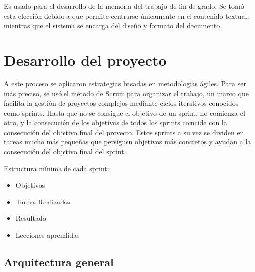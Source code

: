 \documentclass[a4paper, 12pt]{book}
\let\cleardoublepage\clearpage
\begin{document}
Es usado para el desarrollo de la memoria del trabajo de fin de grado. Se tomó esta elección debido a que permite centrarse únicamente en el contenido textual, mientras que el sistema se encarga del diseño y formato del documento. 
\label{sec:seccion11}

\chapter{Desarrollo del proyecto}
\label{chap:Desarollo}
A este proceso se aplicaron estrategias basadas en metodologías ágiles. Para ser más preciso, se usó el método de Scrum para organizar el trabajo, un marco que facilita la gestión de proyectos complejos mediante ciclos iterativos conocidos como sprints. Hasta que no se consigue el objetivo de un sprint, no comienza el otro, y la consecución de los objetivos de todos los sprints coincide con la consecución del objetivo final del proyecto. Estos sprints a su vez se dividen en tareas mucho más pequeñas que persiguen objetivos más concretos y ayudan a la consecución del objetivo final del sprint.

Estructura mínima de cada sprint:
\begin{itemize}
\item Objetivos
\item Tareas Realizadas
\item Resultado
\item Lecciones aprendidas
\end{itemize}

\cleardoublepage

\section{Arquitectura general} 
\label{sec:arquitectura}
\end{document}
